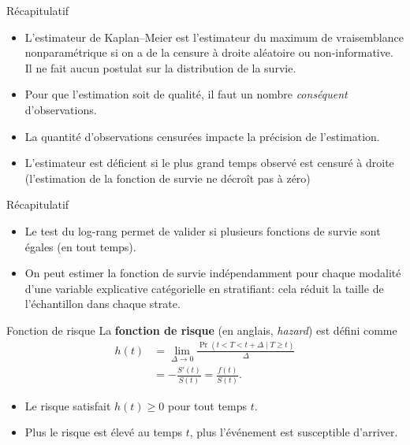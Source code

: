 \documentclass[
  ignorenonframetext,
]{beamer}
\providecommand{\tightlist}{%
  \setlength{\itemsep}{0pt}\setlength{\parskip}{0pt}}
\begin{document}
\begin{frame}{Récapitulatif}
\protect{}\label{ruxe9capitulatif-2}
\begin{itemize}
\tightlist
\item
  L'estimateur de Kaplan--Meier est l'estimateur du maximum de
  vraisemblance nonparamétrique si on a de la censure à droite aléatoire
  ou non-informative. Il ne fait aucun postulat sur la distribution de
  la survie.
\item
  Pour que l'estimation soit de qualité, il faut un nombre
  \emph{conséquent} d'observations.
\item
  La quantité d'observations censurées impacte la précision de
  l'estimation.
\item
  L'estimateur est déficient si le plus grand temps observé est censuré
  à droite (l'estimation de la fonction de survie ne décroît pas à zéro)
\end{itemize}
\end{frame}

\begin{frame}{Récapitulatif}
\protect{}\label{ruxe9capitulatif-3}
\begin{itemize}
\tightlist
\item
  Le test du log-rang permet de valider si plusieurs fonctions de survie
  sont égales (en tout temps).
\item
  On peut estimer la fonction de survie indépendamment pour chaque
  modalité d'une variable explicative catégorielle en stratifiant: cela
  réduit la taille de l'échantillon dans chaque strate.
\end{itemize}
\end{frame}

\begin{frame}{Fonction de risque}
\protect{}\label{fonction-de-risque}
La \textbf{fonction de risque} (en anglais, \emph{hazard}) est défini
comme \begin{align*}
h(t) &=  \lim_{\Delta  \to 0} \frac{\Pr( t < T  < t + \Delta \mid T \geq t)}{\Delta}\\
&= -\frac{S'(t)}{S(t)} = \frac{f(t)}{S(t)}.
\end{align*}

\begin{itemize}
\tightlist
\item
  Le risque satisfait \(h(t) \ge 0\) pour tout temps \(t\).
\item
  Plus le risque est élevé au temps \(t\), plus l'événement est
  susceptible d'arriver.
\end{itemize}
\end{frame}
\end{document}
